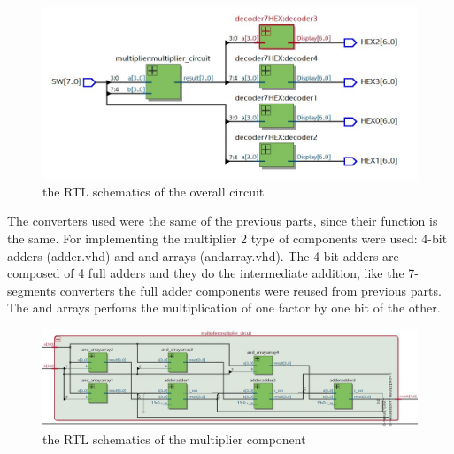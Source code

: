 \documentclass[12pt]{article}
\begin{document}
\begin{figure}[h]
	\centering
	\includegraphics[scale = 0.5]{immagini/RTL_architecture_4.jpg}
	\caption{the RTL schematics of the overall circuit}       

\end{figure}
The converters used were the same of the previous parts, since their function is the same.
For implementing the multiplier 2 type of components were used: 4-bit adders (adder.vhd) and and arrays (and\textunderscore array.vhd).
The 4-bit adders are composed of 4 full adders and they do the intermediate addition, like the 7-segments converters the full adder components were reused from previous parts.
The and arrays perfoms the multiplication of one factor by one bit of the other.
\begin{figure}[h]
	\centering
	\includegraphics[scale = 0.3]{immagini/RTL_multiplier.jpg}
	\caption{the RTL schematics of the multiplier component}       

\end{figure}
\end{document}
